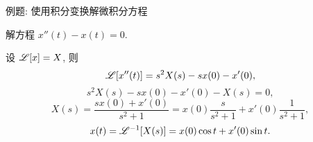 \begin{frame}{例题: 使用积分变换解微积分方程}
\begin{example}
解方程 $x''(t)-x(t)=0$.
\end{example}
\begin{solution}
设 $\mathscr{L}[x]=X$, 则
\[\mathscr{L}[x''(t)]=s^2X(s)-sx(0)-x'(0),\]
\onslide<+->
\vspace{-\baselineskip}
\[s^2X(s)-sx(0)-x'(0)-X(s)=0,\]
\onslide<+->
\vspace{-0.8\baselineskip}
\[X(s)=\frac{sx(0)+x'(0)}{s^2+1}=x(0)\frac s{s^2+1}+x'(0)\frac1{s^2+1},\]
\onslide<+->
\vspace{-0.8\baselineskip}
\[x(t)=\mathscr{L}^{-1}[X(s)]=x(0)\cos t+x'(0)\sin t.\]
\end{solution}
\end{frame}
